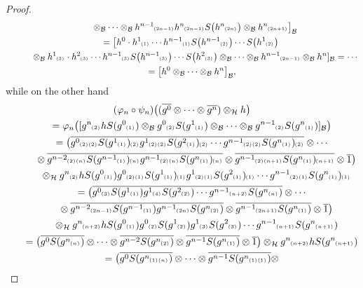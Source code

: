 \documentclass[pdftex]{sigma}
\numberwithin{equation}{section}
\newcommand{\ps}[1]{~\hspace{-4pt}_{^{(#1)}}}
\newcommand{\wbar}[1]{\overline{#1}}
\begin{document}
\begin{proof}
\begin{gather*}
\qquad\phantom{=}{}
\otimes_{\cal B}\cdots \otimes_{\cal B} h^{n-1}\ps{2n-1}h^n\ps{2n-1}S\big(h^n\ps{2n}\big)\otimes_{\cal B} h^n\ps{2n+1}\big]_{\cal B}
\\
\qquad
=\big[h^0\cdot h^1\ps{1}\cdots h^{n-1}\ps{1}S\big(h^{n-1}\ps{2}\big)\cdots S\big(h^1\ps{2}\big)
\\
\qquad\phantom{=}{}
\otimes_{\cal B}
h^1\ps{3}\cdot h^2\ps{3}\cdots h^{n-1}\ps{3}S\big(h^{n-1}\ps{3}\big)\cdots S\big(h^2\ps{3}\big)\otimes_{\cal B}
\cdots \otimes_{\cal B} h^{n-1}\ps{2n-1}\otimes_{\cal B} h^n]_{\cal B} =\cdots
\\
\qquad{}
=\big[h^0\otimes_{\cal B}\cdots\otimes_{\cal B} h^n\big]_{\cal B},
\end{gather*}
while on the other hand
\begin{gather*}
(\varphi_n \circ \psi_n)\big((\wbar{g^0}\otimes\cdots\otimes \wbar{g^n})\otimes_{\cal H} h \big)
\\
\qquad
=\varphi_n\big([g^n\ps{2}hS(g^0\ps{1}) \otimes_{\cal B} g^0\ps{2}S(g^1\ps{1}) \otimes_{\cal B} \cdots \otimes_{\cal B}
g^{n-1}\ps{2}S(g^n\ps{1})]_{\cal B} \big)
\\
\qquad
=\big(\wbar{g^0\ps{2}\ps{2}S(g^1\ps{1})\ps{2}g^1\ps{2}\ps{2}S(g^2\ps{1})\ps{2} \cdots
g^{n-1}\ps{2}\ps{2}S(g^n\ps{1})\ps{2}} \otimes \cdots
\\
\qquad
\phantom{=}{}
\otimes \wbar{g^{n-2}\ps{2}\ps{n}S(g^{n-1}\ps{1})\ps{n}g^{n-1}\ps{2}\ps{n}S(g^n\ps{1})\ps{n}}\otimes
\wbar{g^{n-1}\ps{2}\ps{n+1}S(g^n\ps{1})\ps{n+1}} \otimes \wbar{1}\big)
\\
\qquad\phantom{=}{}\otimes_{\cal H}
g^n\ps{2}hS(g^0\ps{1})g^0\ps{2}\ps{1}S(g^1\ps{1})\ps{1}g^1\ps{2}\ps{1}S(g^2\ps{1})\ps{1}\cdots
g^{n-1}\ps{2}\ps{1}S(g^n\ps{1})\ps{1}
\\
\qquad
=\big(\wbar{g^0\ps{3}S(g^1\ps{1})g^1\ps{4}S(g^2\ps{2}) \cdots g^{n-1}\ps{n+2}S(g^n\ps{n})} \otimes \cdots
\\
\qquad
\phantom{=}
\otimes \wbar{g^{n-2}\ps{2n-1}S(g^{n-1}\ps{1})g^{n-1}\ps{2n}S(g^n\ps{2})}\otimes
\wbar{g^{n-1}\ps{2n+1}S(g^n\ps{1})} \otimes \wbar{1}\big)
\\
\qquad\phantom{=}\otimes_{\cal H}
g^n\ps{n+2}hS(g^0\ps{1})g^0\ps{2}S(g^1\ps{2})g^1\ps{3}S(g^2\ps{3})\cdots g^{n-1}\ps{n+1}S(g^n\ps{n+1})
\\
\qquad
=\big(\wbar{g^0S(g^n\ps{n})} \otimes \cdots\otimes \wbar{g^{n-2}S(g^n\ps{2})}\otimes \wbar{g^{n-1}S(g^n\ps{1})} \otimes
\wbar{1}\big)\otimes_{\cal H} g^n\ps{n+2}hS(g^n\ps{n+1})
\\
\qquad
=\big(\wbar{g^0S(g^n\ps{1}\ps{n})} \otimes\cdots\otimes \wbar{g^{n-1}S(g^n\ps{1}\ps{1})}\otimes

\end{gather*}
\end{proof}
\end{document}
